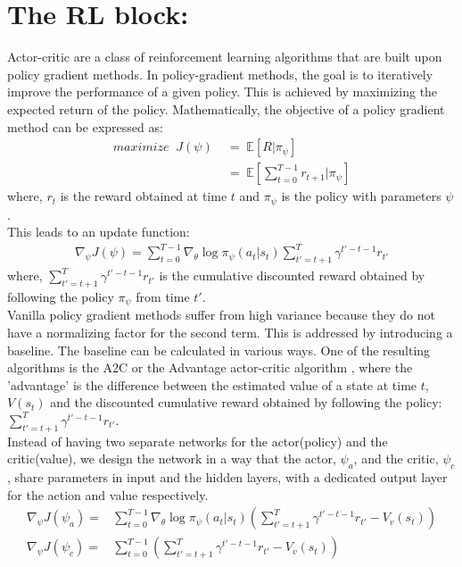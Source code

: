 \section*{The RL block:}

Actor-critic are a class of reinforcement learning algorithms that are built upon policy gradient methods. 
In policy-gradient methods, the goal is to iteratively improve the performance of a given policy. This is achieved by maximizing the expected return of the policy. Mathematically, the objective of a policy gradient method can be expressed as:
\begin{align}
maximize \;\; J( \psi )  &\; = \; \mathbb{E} [ R | \pi_{\psi} ] \\
                       & \; = \; \mathbb{E}[ \sum^{T-1}_{t=0} r_{t+1}| \pi_{\psi}] 
\end{align}
where, $r_{t}$ is the reward obtained at time $t$ and $\pi_{\psi}$ is the policy with parameters $\psi$.\\
This leads to an update function:
\begin{align}
\label{eq:policy-gradient-update}
\nabla_{\psi} J (\psi) = \sum_{t=0}^{T-1} \nabla_{\theta}\log \pi_{\psi}(a_{t}|s_{t})\sum_{t'=t+1}^{T} \gamma^{t'-t-1} r_{t'}
\end{align} 
where, $\sum_{t'=t+1}^{T} \gamma^{t'-t-1} r_{t'}$ is the cumulative discounted reward obtained by following the policy $\pi_{\psi}$ from time $t'$.\\
Vanilla policy gradient methods suffer from high variance because they do not have a normalizing factor for the second term. This is addressed by introducing a baseline. The baseline can be calculated in various ways. One of the resulting algorithms is the A2C or the Advantage actor-critic algorithm \cite{mnih_actor_critic_2016}, where the 'advantage' is the difference between the estimated value of a state at time $t$, $V(s_t)$ and the discounted cumulative reward obtained by following the policy: $\sum_{t'=t+1}^{T} \gamma^{t'-t-1} r_{t'}$. \\
Instead of having two separate networks for the actor(policy) and the critic(value), we design the network in a way that the actor, $\psi_{a}$, and the critic, $\psi_{c}$, share parameters in input and the hidden layers, with a dedicated output layer for the action and value respectively.
\begin{align}
\label{eq:advantage-actor-update}
\nabla_{\psi} J (\psi_{a}) = & \sum_{t=0}^{T-1} \nabla_{\theta}\log \pi_{\psi}(a_{t}|s_{t}) \left(\sum_{t'=t+1}^{T} \gamma^{t'-t-1} r_{t'} - V_{v}(s_{t})\right)\\
\label{eq:advantage-critic-update}
\nabla_{\psi} J (\psi_{c}) = & \sum_{t=0}^{T-1} \left(\sum_{t'=t+1}^{T} \gamma^{t'-t-1} r_{t'} - V_{v}(s_{t})\right)
\end{align} 
